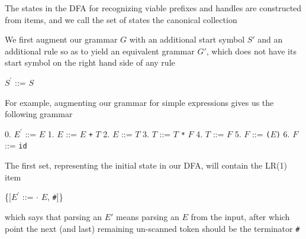 \documentclass[8pt,a4paper,compress]{beamer}
\newcommand{\mm}[1]{$#1$}
\newcommand{\expo}[2]{$#1^{#2}$}
\newenvironment{spaced}
{
\smallskip
\hspace{.5cm}
\begin{minipage}[c]{\textwidth}
}
{
\end{minipage}
\smallskip
}
\begin{document}
\begin{frame}[fragile]
\pause

The states in the DFA for recognizing viable prefixes and handles are constructed from items, and we call the set of states the canonical collection

\pause
\bigskip

We first augment our grammar $G$ with an additional start symbol $S'$ and an additional rule so as to yield an equivalent grammar $G'$, which does not have its start symbol on the right hand side of any rule

\text{ }
\begin{spaced}
\begin{production}
\expo{S}{\prime} ::= \mm{S}
\end{production}
\end{spaced}

\pause

For example, augmenting our grammar for simple expressions gives us the following grammar

\text{ }
\begin{spaced}
\begin{production}
0. \expo{E}{\prime} ::= \mm{E}
1. \mm{E}  ::= \mm{E} \lstinline{+} \mm{T}
2. \mm{E}  ::= \mm{T}
3. \mm{T}  ::= \mm{T} \lstinline{*} \mm{F}
4. \mm{T}  ::= \mm{F}
5. \mm{F}  ::= \lstinline{(}\mm{E}\lstinline{)}
6. \mm{F}  ::= \lstinline{id}
\end{production}
\end{spaced}

\pause

The first set, representing the initial state in our DFA, will contain the LR(1) item

\text{ }
\begin{spaced}
\begin{production}
\{[\expo{E}{\prime} ::= \mm{\cdot} \mm{E}, \lstinline{#}]\}
\end{production}
\end{spaced}

\noindent which says that parsing an $E'$ means parsing an $E$ from the input, after which point the next (and last) remaining un-scanned token should be the terminator \lstinline{#}
\end{frame}
\end{document}
